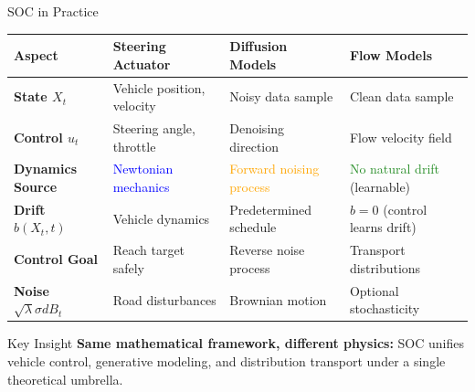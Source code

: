 \documentclass[aspectratio=169,xcolor=dvipsnames]{beamer}
\begin{document}
\begin{frame}{SOC in Practice}

    \vspace{-0.3cm}
    \begin{table}
        \centering
        \small
        \begin{tabular}{>{\centering\arraybackslash}p{}|>{\centering\arraybackslash}p{}|>{\centering\arraybackslash}p{}|>{\centering\arraybackslash}p{}}
            \toprule
            \textbf{Aspect} & \textbf{Steering Actuator} & \textbf{Diffusion Models} & \textbf{Flow Models} \\
            \midrule
            \textbf{State $X_t$} & Vehicle position, velocity & Noisy data sample & Clean data sample \\
            \midrule
            \textbf{Control $u_t$} & Steering angle, throttle & Denoising direction & Flow velocity field \\
            \midrule
            \textbf{Dynamics Source} & \textcolor{blue}{Newtonian mechanics} & \textcolor{orange}{Forward noising process} & \textcolor{ForestGreen}{No natural drift} (learnable) \\
            \midrule
            \textbf{Drift $b(X_t,t)$} & Vehicle dynamics & Predetermined schedule & $b = 0$ (control learns drift) \\
            \midrule
            \textbf{Control Goal} & Reach target safely & Reverse noise process & Transport distributions \\
            \midrule
            \textbf{Noise $\sqrt{\lambda}\sigma dB_t$} & Road disturbances & Brownian motion & Optional stochasticity \\
            \bottomrule
        \end{tabular}
    \end{table}
    
    \vspace{0.3cm}
    
    \begin{alertblock}{Key Insight}
        \textbf{Same mathematical framework, different physics:} SOC unifies vehicle control, generative modeling, and distribution transport under a single theoretical umbrella.
    \end{alertblock}

\end{frame}
\end{document}
